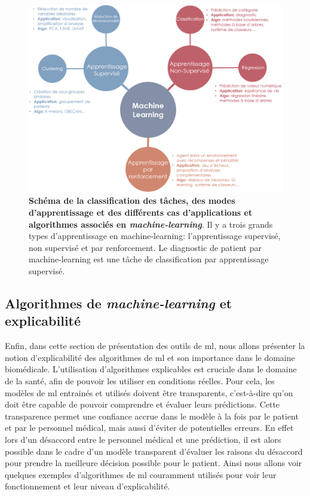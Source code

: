 \begin{figure}[htbp]
 \centering
 \includegraphics[width=1\textwidth]{figures/ml_landscape.png}
 \caption[Schéma des méthodes de machine-learning]{\textbf{Schéma de la classification des tâches, des modes d'apprentissage et des différents cas d'applications et algorithmes associés en \textit{machine-learning}}. Il y a trois grands types d'apprentissage en machine-learning: l'apprentissage supervisé, non supervisé et par renforcement. Le diagnostic de patient par machine-learning est une tâche de classification par apprentissage supervisé.}
 \label{fig:ml-landscape}
\end{figure}

\subsection{Algorithmes de \textit{machine-learning} et explicabilité}\label{xai-sec}
Enfin, dans cette section de présentation des outils de \gls{ml}, nous allons présenter la notion d'explicabilité des algorithmes de \gls{ml} et son importance dans le domaine biomédicale. L'utilisation d'algorithmes explicables est cruciale dans le domaine de la santé, afin de pouvoir les utiliser en conditions réelles. Pour cela, les modèles de \gls{ml} entrainés et utilisés doivent être transparents, c'est-à-dire qu'on doit être capable de pouvoir comprendre et évaluer leurs prédictions. Cette transparence permet une confiance accrue dans le modèle à la fois par le patient et par le personnel médical, mais aussi d'éviter de potentielles erreurs. En effet lors d'un désaccord entre le personnel médical et une prédiction, il est alors possible dans le cadre d'un modèle transparent d'évaluer les raisons du désaccord pour prendre la meilleure décision possible pour le patient. Ainsi nous allons voir quelques exemples d'algorithmes de \gls{ml} couramment utilisés pour voir leur fonctionnement et leur niveau d'explicabilité.

